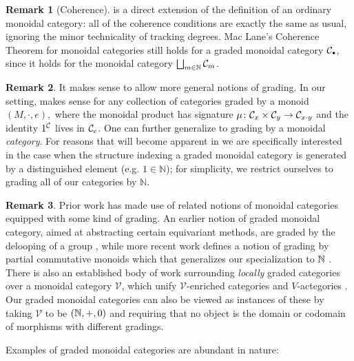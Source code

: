 \documentclass[openany, amssymb, psamsfonts]{amsart}
\theoremstyle{definition}
\newtheorem{rem}{Remark}[section]
\numberwithin{equation}{section}
\begin{document}
\begin{rem}[Coherence]
     is a direct extension of the definition of an ordinary monoidal category: all of the coherence conditions are exactly the same as usual, ignoring the minor technicality of tracking degrees. Mac Lane's Coherence Theorem for monoidal categories \cite[Section VII]{maclane} still holds for a graded monoidal category $\C_\sbull$, since it holds for the monoidal category $\bigsqcup_{m \in \mathbb{N}} \mathcal{C}_m$.
\end{rem}

\begin{rem}
It makes sense to allow more general notions of grading. In our setting,  makes sense for any collection of categories graded by a monoid $(M, \cdot, e),$ where the monoidal product has signature $\mu \colon \mathcal{C}_x \times \mathcal{C}_y \to \mathcal{C}_{x\cdot y}$ and the identity $1^{\mathcal{C}}$ lives in $\mathcal{C}_e$. One can further generalize to grading by a monoidal \emph{category}. For reasons that will become apparent in  we are specifically interested in the case when the structure indexing a graded monoidal category is generated by a distinguished element (e.g. $1 \in \mathbb{N}$); for simplicity, we restrict ourselves to grading all of our categories by $\mathbb{N}$.
\end{rem}

\begin{rem}
Prior work has made use of related notions of monoidal categories equipped with some kind of grading. An earlier notion of graded monoidal category, aimed at abstracting certain equivariant methods, are graded by the delooping of a group \cite{frohlich-wall}, while more recent work defines a notion of grading by partial commutative monoids which that generalizes our specialization to $\mathbb{N}$ \cite{earnshaw-nester-roman}. There is also an established body of work surrounding \emph{locally} graded categories over a monoidal category $\mathcal{V}$, which unify $\mathcal{V}$-enriched categories and $V$-actegories \cite{lucyshyn-wright, wood}. Our graded monoidal categories can also be viewed as instances of these by taking $\mathcal{V}$ to be $(\mathbb{N}, +, 0)$ and requiring that no object is the domain or codomain of morphisms with different gradings.
\end{rem}

Examples of graded monoidal categories are abundant in nature:
\end{document}
